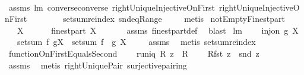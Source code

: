 \begin{isabellebody}
%
\isadelimproof
\ \ %
\endisadelimproof
%
\isatagproof
{}\isamarkupfalse%
\ assms\ lm{}{}{}\ converse{\isacharunderscore}converse\ rightUniqueInjectiveOnFirst\ rightUniqueInjectiveOnFirst\isanewline
\ \ \ \ \ \ \ \ setsum{\isachardot}reindex\ snd{\isacharunderscore}eq{\isacharunderscore}Range\ \isanewline
\ \ \isamarkupfalse%
\ metis%
\endisatagproof
{\isafoldproof}%
%
\isadelimproof
\isanewline
%
\endisadelimproof
\isanewline
{}\isamarkupfalse%
\ notEmptyFinestpart{\isacharcolon}\ \isanewline
\ \ \ {\isachardoublequoteopen}X\ {\isasymnoteq}\ {\isacharbraceleft}{\isacharbraceright}{\isachardoublequoteclose}\ \isanewline
\ \ \ {\isachardoublequoteopen}finestpart\ X\ {\isasymnoteq}\ {\isacharbraceleft}{\isacharbraceright}{\isachardoublequoteclose}\ \isanewline
%
\isadelimproof
\ \ %
\endisadelimproof
%
\isatagproof
{}\isamarkupfalse%
\ assms\ finestpart{\isacharunderscore}def\ \isamarkupfalse%
\ blast%
\endisatagproof
{\isafoldproof}%
%
\isadelimproof
\isanewline
%
\endisadelimproof
\isanewline
{}\isamarkupfalse%
\ lm{}{}{}{\isacharcolon}\ \isanewline
\ \ \ {\isachardoublequoteopen}inj{\isacharunderscore}on\ g\ X{\isachardoublequoteclose}\ \isanewline
\ \ \ {\isachardoublequoteopen}setsum\ f\ {\isacharparenleft}g{\isacharbackquote}X{\isacharparenright}\ {\isacharequal}\ setsum\ {\isacharparenleft}f\ {\isasymcirc}\ g{\isacharparenright}\ X{\isachardoublequoteclose}\ \isanewline
%
\isadelimproof
\ \ %
\endisadelimproof
%
\isatagproof
{}\isamarkupfalse%
\ assms\ \isamarkupfalse%
\ {\isacharparenleft}metis\ setsum{\isachardot}reindex{\isacharparenright}%
\endisatagproof
{\isafoldproof}%
%
\isadelimproof
\isanewline
%
\endisadelimproof
\isanewline
{}\isamarkupfalse%
\ functionOnFirstEqualsSecond{\isacharcolon}\ \isanewline
\ \ \ {\isachardoublequoteopen}runiq\ R{\isachardoublequoteclose}\ {\isachardoublequoteopen}z\ {\isasymin}\ R{\isachardoublequoteclose}\ \isanewline
\ \ \ {\isachardoublequoteopen}R{\isacharcomma}{\isacharcomma}{\isacharparenleft}fst\ z{\isacharparenright}\ {\isacharequal}\ snd\ z{\isachardoublequoteclose}\ \isanewline
%
\isadelimproof
\ \ %
\endisadelimproof
%
\isatagproof
{}\isamarkupfalse%
\ assms\ \isamarkupfalse%
\ {\isacharparenleft}metis\ rightUniquePair\ surjective{\isacharunderscore}pairing{\isacharparenright}%

\end{isabellebody}
